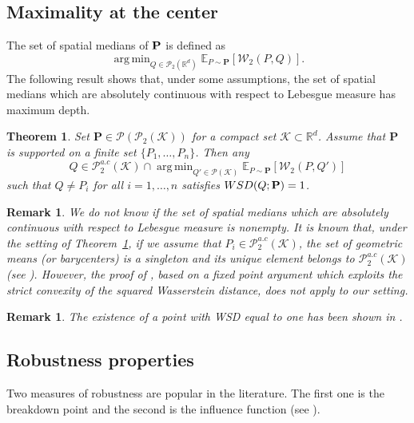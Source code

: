 \documentclass{imsart}
\newtheorem {Theorem}[Proposition]{Theorem}
\newtheorem {Remark}[Proposition]{Remark}
\numberwithin{equation}{section}
\def\R{\mathbb{R}}
\def\E{\mathbb{E}}
\DeclareMathOperator*{\argmin}{arg\,min}
\def\E{\mathbb E}
\begin{document}
\subsection{Maximality at the center}
The set of spatial medians of ${\bf P}$ is defined as
$$ \argmin_{Q\in \mathcal{P}_2(\R^d)}\E_{P\sim \mathbf{P}}[\mathcal{W}_2(P,Q)] .$$
The following result shows that, under some assumptions,  the set of spatial medians which are absolutely continuous with respect to Lebesgue measure has maximum depth.
\begin{Theorem}\label{Theo:RelationSpatial}
	Set  $\mathbf{P}\in \mathcal{P}(\mathcal{P}_2(\mathcal{K})) $ for a compact set $\mathcal{K}\subset \R^d$. Assume that $\mathbf{P}$ is supported on a finite set $\{P_1, \dots, P_n\}$. Then any 
	$$ Q\in \mathcal{P}^{a.c}_2(\mathcal{K})\cap \argmin_{Q'\in \mathcal{P}(\mathcal{K})}\E_{P\sim \mathbf{P}}[\mathcal{W}_2(P,Q')] $$
	such that $Q\neq P_i $ for all $i=1, \dots, n$ satisfies
	$ {\rm WSD}(Q; {\bf P})=1$.
\end{Theorem}
\begin{Remark}
	We do not know if the set of spatial medians which are absolutely continuous with respect to Lebesgue measure is nonempty. It is known that,  under the setting of Theorem~\ref{Theo:RelationSpatial}, if we assume that $P_i\in \mathcal{P}^{a.c}_2(\mathcal{K})$,  the set of geometric means (or barycenters) is a singleton and its unique element belongs to $\mathcal{P}^{a.c}_2(\mathcal{K})$ (see \cite{AlvarezEsteban2016}). However, the proof of \cite{AlvarezEsteban2016}, based on a fixed point argument which exploits the strict convexity of the squared Wasserstein distance, does not apply to our setting. 
\end{Remark}
\begin{Remark}
	The existence of a point with WSD equal to one has been shown in \cite{you2025wasserstein}.
\end{Remark}



\subsection{Robustness properties} \label{subsection:robustness}
Two measures of robustness are popular in the literature. The first one is the breakdown point and the second is the influence function (see \cite{Hampel.2005.book,Huber.2009.book}).
\end{document}

